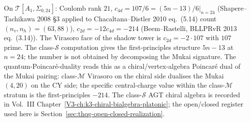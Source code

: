 \begin{remark}
\label{rem:pdq-2}
On $\mathcal T[A_1,\Sigma_{0,24}]$: Coulomb rank $21$,
$c_{4d} = 107/6 = (5n-13)/6|_{n=24}$ (Shapere--Tachikawa 2008
\S 3 applied to Chacaltana--Distler 2010 eq.~(5.14) count
$(n_v, n_h) = (63, 88)$), $c_{2d} = -12 c_{4d} = -214$
(Beem--Rastelli, BLLPRvR 2013 eq.~(3.14)). The Virasoro face of the
shadow tower is $c_{2d} = -2\cdot 107$ with $107$ prime.  The
class-$\mathcal S$ computation gives the first-principles structure
$5n-13$ at $n=24$; the number is not obtained by decomposing the
Mukai signature. The quantum-Poincar\'e-duality reads
this as a chiral/vertex-algebra Poincar\'e dual of the Mukai
pairing: class-$\mathcal M$ Virasoro on the chiral side dualises
the Mukai $(4,20)$ on the CY side; the specific central-charge
value within the class-$\mathcal M$ stratum is the
first-principles $-214$.
The class-$\mathcal S$ AGT chiral algebra is recorded in
Vol.~III Chapter~\ref{V3-ch:k3-chiral-bialgebra-platonic}; the
open/closed register used here is
Section~\ref{sec:thqg-open-closed-realization}.
\end{remark}

